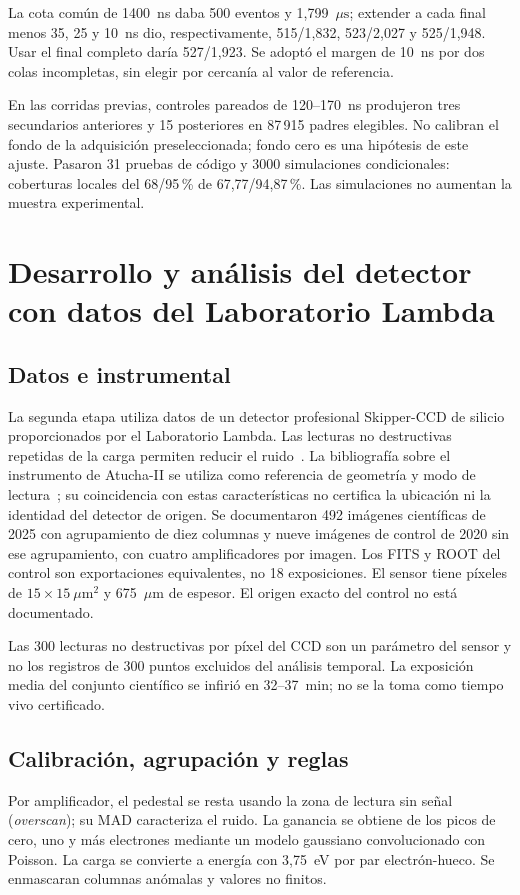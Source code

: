 \documentclass[10pt,a4paper]{article}
\newcommand{\us}{\ensuremath{\mu\mathrm{s}}}
\begin{document}
La cota común de 1400~ns daba 500 eventos y 1{,}799~\us; extender a cada final menos 35, 25 y 10~ns dio, respectivamente, 515/1{,}832, 523/2{,}027 y 525/1{,}948. Usar el final completo daría 527/1{,}923. Se adoptó el margen de 10~ns por dos colas incompletas, sin elegir por cercanía al valor de referencia.

En las corridas previas, controles pareados de 120--170~ns produjeron tres secundarios anteriores y 15 posteriores en 87\,915 padres elegibles. No calibran el fondo de la adquisición preseleccionada; fondo cero es una hipótesis de este ajuste. Pasaron 31 pruebas de código y 3000 simulaciones condicionales: coberturas locales del 68/95\,\% de 67{,}77/94{,}87\,\%. Las simulaciones no aumentan la muestra experimental.

\newpage
\section{Desarrollo y análisis del detector con datos del Laboratorio Lambda}
\subsection{Datos e instrumental}
La segunda etapa utiliza datos de un detector profesional Skipper-CCD de silicio proporcionados por el Laboratorio Lambda. Las lecturas no destructivas repetidas de la carga permiten reducir el ruido~\cite{skipper}. La bibliografía sobre el instrumento de Atucha-II se utiliza como referencia de geometría y modo de lectura~\cite{atucha}; su coincidencia con estas características no certifica la ubicación ni la identidad del detector de origen.
Se documentaron 492 imágenes científicas de 2025 con agrupamiento de diez columnas y nueve imágenes de control de 2020 sin ese agrupamiento, con cuatro amplificadores por imagen. Los FITS y ROOT del control son exportaciones equivalentes, no 18 exposiciones. El sensor tiene píxeles de $15\times15~\mu$m$^2$ y 675~$\mu$m de espesor. El origen exacto del control no está documentado.

Las 300 lecturas no destructivas por píxel del CCD son un parámetro del sensor y no los registros de 300 puntos excluidos del análisis temporal. La exposición media del conjunto científico se infirió en 32--37~min; no se la toma como tiempo vivo certificado.

\subsection{Calibración, agrupación y reglas}
Por amplificador, el pedestal se resta usando la zona de lectura sin señal (\emph{overscan}); su MAD caracteriza el ruido. La ganancia se obtiene de los picos de cero, uno y más electrones mediante un modelo gaussiano convolucionado con Poisson. La carga se convierte a energía con 3{,}75~eV por par electrón-hueco. Se enmascaran columnas anómalas y valores no finitos.
\end{document}

